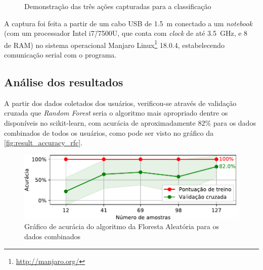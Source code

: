 \begin{figure}[ht]
	\caption{\label{fig:result_estados}Demonstração das três ações capturadas para a classificação}
	\begin{center}
	\end{center}
\end{figure}

A captura foi feita a partir de um cabo USB de \SI{1.5}{\meter} conectado a um \textit{notebook} (com um processador Intel i7\=/7500U, que conta com \textit{clock} de até \SI{3.5}{\giga\hertz}, e \SI{8}{\giga\byte} de RAM) no sistema operacional Manjaro Linux\footnote{\url{http://manjaro.org/}} 18.0.4, estabelecendo comunicação serial com o programa.

\subsection{Análise dos resultados}\label{sec:result_analise}

A partir dos dados coletados dos usuários, verificou-se através de validação cruzada que \textit{Random Forest} seria o algoritmo mais apropriado dentre os disponíveis no scikit-learn, com acurácia de aproximadamente \(82\%\) para os dados combinados de todos os usuários, como pode ser visto no gráfico da \autoref{fig:result_accuracy_rfc}.

\begin{figure}[ht]
	\caption{\label{fig:result_accuracy_rfc}Gráfico de acurácia do algoritmo da Floresta Aleatória para os dados combinados}
	\begin{center}
	    \includegraphics[width=\textwidth]{resources/result_accuracy_rfc}
	\end{center}
\end{figure}

